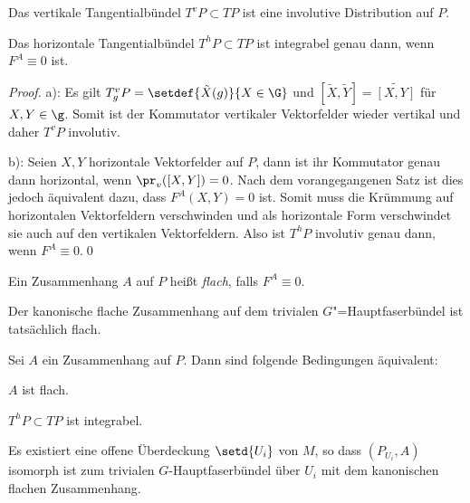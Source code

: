 \documentclass[%
	paper=a5,%
	fleqn,%
	DIV=18,%
	BCOR=0mm,
	fontsize=11pt,
	titlepage=false,%
	bibliography=totoc,
	DIV=18,%
	twoside=true,
	pdftitle=Riemannsche Geometrie,
	pdfauthor=Uwe Semmelmann,
	numbers=noendperiod]%
	{scrbook}
\begin{document}
\begin{prop}
\label{prop:Integrabilität-Krümmung}
\begin{propenum}
\item Das vertikale Tangentialbündel $T^vP\subset TP$ ist eine involutive
Distribution auf $P$.
\item Das horizontale Tangentialbündel $T^hP\subset TP$ ist integrabel genau
dann, wenn $F^A \equiv 0$ ist.\fish
\end{propenum}
\end{prop}
\begin{proof}
a): Es gilt $T^v_gP = \setdef{\tilde{X}(g)}{X\in\G}$ und 
$[\tilde{X},\tilde{Y}] = \widetilde{[X,Y]}$ für $X,Y\in\g$. Somit ist der
Kommutator vertikaler Vektorfelder wieder vertikal und daher $T^vP$ involutiv.

b): Seien $X,Y$ horizontale Vektorfelder auf $P$, dann ist ihr Kommutator genau
dann horizontal, wenn $\pr_v([X,Y]) = 0$. Nach dem vorangegangenen Satz ist dies
jedoch äquivalent dazu, dass $F^A(X,Y) = 0$ ist. Somit muss die Krümmung
auf horizontalen Vektorfeldern verschwinden und als horizontale Form
verschwindet sie auch auf den vertikalen Vektorfeldern. Also ist $T^hP$
involutiv genau dann, wenn $F^A\equiv 0$.\qed
\end{proof}

\begin{defn}
Ein Zusammenhang $A$ auf $P$ heißt \emph{flach}, falls $F^A\equiv 0$.\fish
\end{defn}

\begin{ex}
Der kanonische flache Zusammenhang auf dem trivialen $G$"=Hauptfaserbündel
ist tatsächlich flach.\boxc
\end{ex}

\begin{prop}
Sei $A$ ein Zusammenhang auf $P$. Dann sind folgende Bedingungen äquivalent:
\begin{equivenum}
\item $A$ ist flach.
\item $T^hP\subset TP$ ist integrabel.
\item Es existiert eine offene Überdeckung $\setd{U_i}$ von $M$, so dass
$(P_{U_i},A)$ isomorph ist zum trivialen $G$-Hauptfaserbündel  über $U_i$ mit
dem kanonischen flachen Zusammenhang.\fish
\end{equivenum}
\end{prop}
\end{document}
